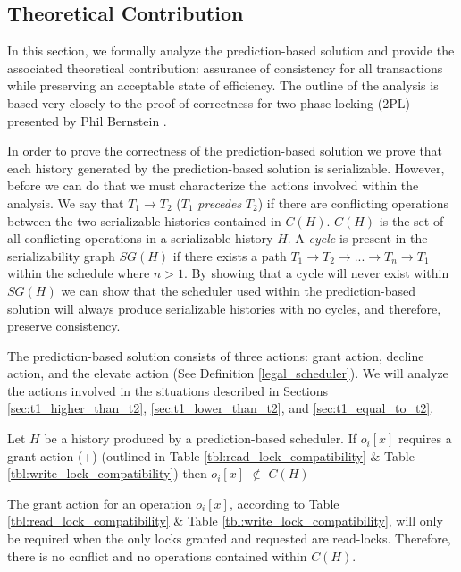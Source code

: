 \subsection{Theoretical Contribution}
In this section, we formally analyze the prediction-based solution and provide the associated theoretical contribution: assurance of consistency for all transactions while preserving an acceptable state of efficiency. The outline of the analysis is based very closely to the proof of correctness for two-phase locking (2PL) presented by Phil Bernstein \cite[pp. 53-56]{Bernstein_1986:CCR:17299}. 

In order to prove the correctness of the prediction-based solution we prove that each history generated by the prediction-based solution is serializable. However, before we can do that we must characterize the actions involved within the analysis. We say that $T_{1} \rightarrow T_{2}$ ($T_{1}$ \textit{precedes} $T_{2}$) if there are conflicting operations between the two serializable histories contained in $C(H)$. $C(H)$ is the set of all conflicting operations in a serializable history $H$. A \textit{cycle} is present in the serializability graph $SG(H)$ if there exists a path $T_{1} \rightarrow T_{2} \rightarrow ... \rightarrow T_{n} \rightarrow T_{1}$ within the schedule where $n > 1$. By showing that a cycle will never exist within $SG(H)$ we can show that the scheduler used within the prediction-based solution will always produce serializable histories with no cycles, and therefore, preserve consistency.

The prediction-based solution consists of three actions: grant action, decline action, and the elevate action (See Definition \ref{legal_scheduler}). We will analyze the actions involved in the situations described in Sections \ref{sec:t1_higher_than_t2}, \ref{sec:t1_lower_than_t2}, and \ref{sec:t1_equal_to_t2}.

\begin{proposition}
\label{prop:grant}
Let $H$ be a history produced by a prediction-based scheduler. If $o_{i}[x]$ requires a grant action (+) (outlined in Table \ref{tbl:read_lock_compatibility} \& Table \ref{tbl:write_lock_compatibility}) then $o_{i}[x]$ $\notin$ $C(H)$
\end{proposition}

The grant action for an operation $o_{i}[x]$, according to Table \ref{tbl:read_lock_compatibility} \& Table \ref{tbl:write_lock_compatibility}, will only be required when the only locks granted and requested are read-locks. Therefore, there is no conflict and no operations contained within $C(H)$.

